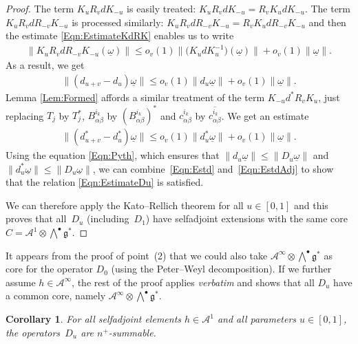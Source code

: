 \documentclass[pdftex]{sigma}
\newtheorem{Corollary}[Theorem]{Corollary}
\newcommand{\Aa}{\mathcal{A}}
\newcommand{\Core}{C}
\newcommand{\LieG}{\mathfrak{g}}
\newcommand{\omegat}{\underline{\omega}}
\numberwithin{equation}{section}
\begin{document}
\begin{proof}
The term $K_u R_v d K_{-u}$ is easily treated: $K_u R_v d K_{-u} = R_v K_u d K_{-u}$. The term $K_u R_v d R_{-v} K_{-u}$ is processed similarly: $ K_u R_v d R_{-v} K_{-u} = R_v K_u d R_{-v} K_{-u}$ and then the estimate \eqref{Eqn:EstimateKdRK} enables us to write
\begin{gather*}
\| K_u R_v d R_{-v} K_{-u}(\omegat) \| \leqslant o_v(1) \big\| \big(K_u d K_u^{-1}\big)(\omegat) \big\| + o_v(1) \| \omegat \|.
\end{gather*}
As a result, we get
\begin{gather}
\label{Eqn:Estd}
\| (d_{u+v} - d_u) \omegat \| \leqslant o_v(1) \| d_u \omegat \| + o_v(1) \| \omegat \|.
\end{gather}
Lemma \ref{Lem:Formed} af\/fords a similar treatment of the term $K_{-u} d^* R_v K_u $, just replacing $T_j$ by $T^*_j$, $B^{i_k}_{\alpha \beta}$ by $(B^{i_k}_{\alpha \beta})^*$ and $c^{i_k}_{\alpha \beta}$ by $\overline{c^{i_k}_{\alpha \beta}}$. We get an estimate
\begin{gather}
\label{Eqn:EstdAdj}
\| (d_{u+v}^* - d_u^*) \omegat \| \leqslant o_v(1) \| d_u^* \omegat \| + o_v(1) \| \omegat \|.
\end{gather}
Using the equation \eqref{Eqn:Pyth}, which ensures that $\| d_u \omegat \| \leqslant \| D_u \omegat \|$ and $\| d_u^* \omegat \| \leqslant \| D_u \omegat \|$, we can combine~\eqref{Eqn:Estd} and~\eqref{Eqn:EstdAdj} to show that the relation \eqref{Eqn:EstimateDu} is satisf\/ied.

We can therefore apply the Kato--Rellich theorem for all $u \in [0,1]$ and this proves that all~$D_u$ (including~$D_1$) have selfadjoint extensions with the same core $\Core = \Aa^1 \otimes \bigwedge^\bullet \LieG^*$.
\end{proof}

\begin{Remark}
\label{Rk:Domain}
It appears from the proof of point~(2) %
that we could also take $\Aa^\infty \otimes \bigwedge^\bullet \LieG^*$ as core for the operator $D_0$ (using the Peter--Weyl decomposition). If we further assume $h \in \Aa^\infty $, the rest of the proof applies \textit{verbatim} and shows that all $D_u$ have a common core, namely $\Aa^\infty \otimes \bigwedge^\bullet \LieG^*$.
\end{Remark}

\begin{Corollary}
\label{Cor:FiniteSumma}
For all selfadjoint elements $h \in \Aa^1$ and all parameters $u \in [0,1]$, the opera\-tors~$D_u$ are $n^+$-summable.
\end{Corollary}
\end{document}
